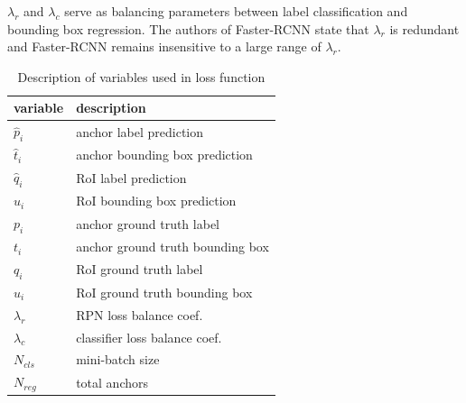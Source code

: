 $\lambda_r$ and $\lambda_c$ serve as balancing parameters between label classification and bounding box regression. The authors of Faster-RCNN state that $\lambda_r$ is redundant and Faster-RCNN remains insensitive to a large range of $\lambda_r$\cite{ref_fasterrcnn}. 

\begin{table}
    \centering
\caption{Description of variables used in loss function}
\label{table:variable-list}
    \begin{tabular}{| l | l |} \hline
variable & description \\ \hline \hline
$\hat{p}_i$ & anchor label prediction \\ \hline 
$\hat{t}_i$ & anchor bounding box prediction \\ \hline 
$\hat{q}_i$ & RoI label prediction \\ \hline 
$\hat{u}_i$ & RoI bounding box prediction \\ \hline 
${p}_i$ & anchor ground truth label \\ \hline 
${t}_i$ & anchor ground truth bounding box \\ \hline 
${q}_i$ & RoI ground truth label \\ \hline 
${u}_i$ & RoI ground truth bounding box  \\ \hline 
$\lambda_r $ & RPN loss balance coef. \\ \hline 
$\lambda_c $ & classifier loss balance coef.  \\ \hline 
$N_{cls}$ & mini-batch size  \\ \hline 
$N_{reg}$ & total anchors \\ \hline 
    \end{tabular}
\end{table}{}